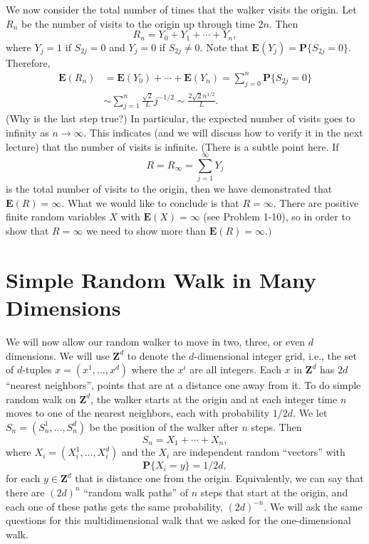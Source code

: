 \documentclass{stml-l}
\theoremstyle{definition}
\numberwithin{equation}{chapter}
\numberwithin{figure}{chapter}
\numberwithin{figure}{section}
\begin{document}
We now consider the total number of times that the walker visits the
origin. Let $R_{n}$ be the number of visits to the origin up through
time $2n$. Then
\begin{equation*}
R_{n}=Y_{0}+Y_{1}+\cdots+Y_{n},
\end{equation*}
where $Y_{j}=1$ if $S_{2j}=0$ and $Y_{j}=0$ if $S_{2j}\neq 0$. Note
that $\mathbf{E}(Y_{j})= \mathbf{P}\{S_{2j}=0\}$. Therefore,
\begin{align*}
\mathbf{E}(R_{n})&=\mathbf{E}(Y_{0})+\cdots+\mathbf{E}(Y_{n})=\sum\limits_{j=0}^{n}\mathbf{P}\{S_{2j}=0\}\\
&\sim\sum\limits_{j=1}^{n}\frac{\sqrt{2}}{L}j^{-1/2}\sim\frac{2\sqrt{2}n^{1/2}}{L}.
\end{align*}
(Why is the last step true?) In particular, the expected number of
visits goes to infinity as $n\rightarrow\infty$. This indicates (and
we will discuss how to verify it in the next lecture) that the
number of visits is infinite. (There is a subtle point here. If
\begin{equation*}
R=R_{\infty}=\sum\limits_{j=1}^{\infty}Y_{j}
\end{equation*}
is the total number of visits to the origin, then we have
demonstrated that $\mathbf{E}(R)=\infty$. What we would like to
conclude is that $R=\infty$. There are positive finite random
variables $X$ with $\mathbf{E}(X)=\infty$ (see Problem 1-10), so in
order to show that $R=\infty$ we need to show more than
$\mathbf{E}(R)=\infty.)$

\chapter{Simple Random Walk in Many Dimensions\label{ch02:chap02}}


We will now allow our random walker to move in two, three, or even
$d$ dimensions. We will use $\mathbf{Z}^{d}$ to denote the
$d$-dimensional integer grid, i.e., the set of $d$-tuples $x=
(x^{1},\ldots,x^{d})$ where the $x^{i}$ are all integers. Each $x$
in $\mathbf{Z}^{d}$ has $2d$ ``nearest neighbors'', points that are
at a distance one away from it. To do simple random walk on
$\mathbf{Z}^{d}$, the walker starts at the origin and at each
integer time $n$ moves to one of the nearest neighbors, each with
probability $1/2d$. We let $S_{n}=(S_{n}^{1},\ldots,S_{n}^{d})$ be
the position of the walker after $n$ steps. Then
\begin{equation*}
S_{n}=X_{1}+\cdots+X_{n},
\end{equation*}
where $X_{i}= (X_{i}^{1},\ldots,X_{i}^{d})$ and the $X_{i}$ are
independent random ``vectors'' with
\begin{equation*}
\mathbf{P}\{X_{i}=y\}=1/2d,
\end{equation*}
for each $y\in \mathbf{Z}^{d}$ that is distance one from the origin.
Equivalently, we can say that there are $(2d)^{n}$ ``random walk
paths'' of $n$ steps that start at the origin, and each one of these
paths gets the same probability, $(2d)^{-n}$. We will ask the same
questions for this multidimensional walk that we asked for the
one-dimensional walk.
\end{document}
